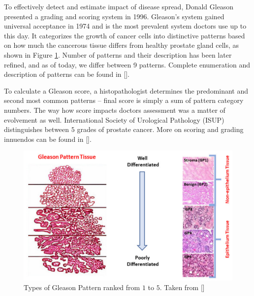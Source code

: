 To effectively detect and estimate impact of disease spread, Donald Gleason presented a grading and scoring system in 1996. Gleason's system gained universal acceptance in 1974 and is the most prevalent system doctors use up to this day. It categorizes the growth of cancer cells into distinctive patterns based on how much the cancerous tissue differs from healthy prostate gland cells, as shown in Figure \ref{fig:gp}. Number of patterns and their description has been later refined, and as of today, we differ between 9 patterns. Complete enumeration and description of patterns can be found in [].

To calculate a Gleason score, a histopathologist determines the predominant and second most common patterns -- final score is simply a sum of pattern category numbers. The way how score impacts doctors assessment was a matter of evolvement as well. International Society of Urological Pathology (ISUP) distinguishes between $5$ grades of prostate cancer. More on scoring and grading innuendos can be found in [].

\begin{figure}[!h]
    \begin{center}
    \begin{minipage}{1\textwidth}
      \includegraphics[width=\textwidth]{img/gp-classification.png}
    \end{minipage}
    \caption{Types of Gleason Pattern ranked from $1$ to $5$. Taken from []}
    \label{fig:gp}
    \end{center}
\end{figure}

